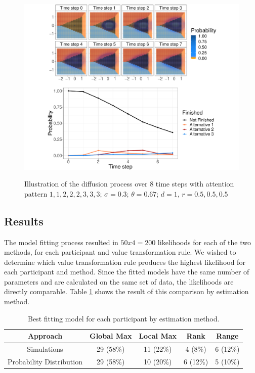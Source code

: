 \documentclass[11pt,a4paper]{article}
\begin{document}
\cleardoublepage
{}
\begin{landscape}
\begin{figure}
\captionsetup{justification=centering}
\caption{Illustration of the diffusion process over 8 time steps with attention pattern $1, 1, 2, 2, 2, 3, 3, 3$; $\sigma = 0.3$; $\theta = 0.67$; $d = 1$, $r = 0.5, 0.5, 0.5$}
\centering
\includegraphics[width=1\textwidth]{process.pdf}
\label{fig:process}
\end{figure}
\end{landscape}
\restoregeometry
\cleardoublepage
{}
\setcounter{page}{\thesavepage} 
 

\subsection{Results}

The model fitting process resulted in $50x4=200$ likelihoods for each of the two methods, for each participant and value transformation rule. We wished to determine which value transformation rule produces the highest likelihood for each participant and method. Since the fitted models have the same number of parameters and are calculated on the same set of data, the likelihoods are directly comparable. Table \ref{table:chap1res} shows the result of this comparison by estimation method.
 
 
\begin{table}[ht]
\caption{Best fitting model for each participant by estimation method.}
\centering
\begin{tabular}{ccccc}   

\toprule Approach  & Global Max    & Local Max & Rank & Range \\ 
\midrule Simulations  &  29 (58\%) & 11 (22\%)  & 4 (8\%)   & 6 (12\%) \\
       Probability Distribution & 29 (58\%)  &    10 (20\%)    & 6 (12\%)   & 5  (10\%)  \\
\bottomrule 
\end{tabular}
\label{table:chap1res}
\end{table}
\end{document}
